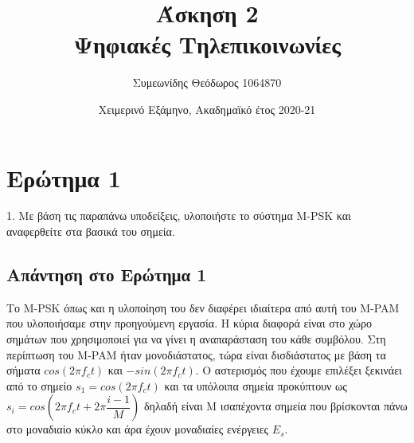 \documentclass{article}
\title{Άσκηση 2 \\ Ψηφιακές Τηλεπικοινωνίες}
\author{Συμεωνίδης Θεόδωρος 1064870}
\date{Χειμερινό Εξάμηνο, Ακαδημαϊκό έτος 2020-21}
\begin{document}
\maketitle

\newpage

\tableofcontents

\newpage

\colorbox{pink}{\textwidth{Ο κώδικας που γράφτηκε έχει επικολληθεί τέλος της εργασίας.}}

\section{Ερώτημα 1}
1. Με βάση τις παραπάνω υποδείξεις, υλοποιήστε το σύστημα Μ-PSK και
αναφερθείτε στα βασικά του σημεία.
\subsection*{Απάντηση στο Ερώτημα 1}
Το M-PSK όπως και η υλοποίηση του δεν διαφέρει ιδιαίτερα από αυτή του M-PAM που υλοποιήσαμε στην προηγούμενη εργασία. Η κύρια διαφορά είναι στο χώρο σημάτων που χρησιμοποιεί για να γίνει η αναπαράσταση του κάθε συμβόλου. Στη περίπτωση του M-PAM ήταν μονοδιάστατος, τώρα είναι δισδιάστατος με βάση τα σήματα $cos(2 \pi f_c t)$ και $-sin(2 \pi f_c t)$. Ο αστερισμός που έχουμε επιλέξει ξεκινάει από το σημείο $s_1 = cos(2 \pi f_c t)$ και τα υπόλοιπα σημεία προκύπτουν ως $s_i = cos(2 \pi f_c t + 2 \pi \dfrac{i-1}{M} )$ δηλαδή είναι M ισαπέχοντα σημεία που βρίσκονται πάνω στο μοναδιαίο κύκλο και άρα έχουν μοναδιαίες ενέργειες $Ε_s$.
\end{document}
